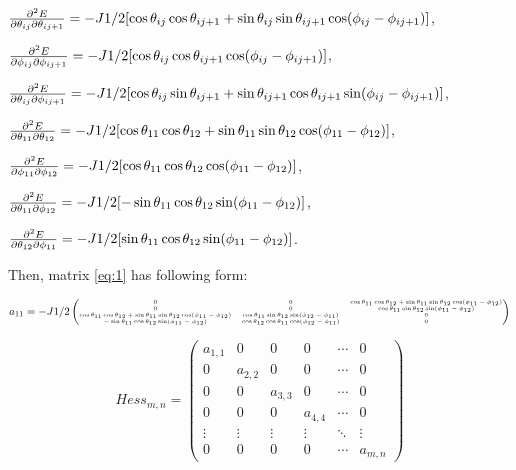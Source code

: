 \documentclass[9pt]{report}
\begin{document}
$\pdv{E}{\theta_{ij}}{\theta_{ij+1}} = -J1/2[\cos\theta_{ij}\cos\theta_{ij+1}+\sin\theta_{ij}\sin\theta_{ij+1}\cos(\phi_{ij}-\phi_{ij+1})]$,

$\pdv{E}{\phi_{ij}}{\phi_{ij+1}} = -J1/2[\cos\theta_{ij}\cos\theta_{ij+1}\cos(\phi_{ij}-\phi_{ij+1})]$,

$\pdv{E}{\theta_{ij}}{\phi_{ij+1}} = -J1/2[\cos\theta_{ij}\sin\theta_{ij+1}+\sin\theta_{ij+1}\cos\theta_{ij+1}\sin(\phi_{ij}-\phi_{ij+1})]$,

$\pdv{E}{\theta_{11}}{\theta_{12}} = -J1/2[\cos\theta_{11}\cos\theta_{12}+\sin\theta_{11}\sin\theta_{12}\cos(\phi_{11}-\phi_{12})]$,

$\pdv{E}{\phi_{11}}{\phi_{12}} = -J1/2[\cos\theta_{11}\cos\theta_{12}\cos(\phi_{11}-\phi_{12})]$,

$\pdv{E}{\theta_{11}}{\phi_{12}} = -J1/2[-\sin\theta_{11}\cos\theta_{12}\sin(\phi_{11}-\phi_{12})]$,

$\pdv{E}{\theta_{12}}{\phi_{11}} = -J1/2[\sin\theta_{11}\cos\theta_{12}\sin(\phi_{11}-\phi_{12})]$.
\newline

Then, matrix \eqref{eq:1} has following form:

\begin{equation}\tiny
	a_{11} = -J1/2\begin{pmatrix}
				0 & 0 & \cos\theta_{11}\cos\theta_{12}+\sin\theta_{11}\sin\theta_{12}\cos(\phi_{11}-\phi_{12})\\
				0 & 0 & \cos\theta_{11}\sin\theta_{12}\sin(\phi_{11}-\phi_{12})\\
				\cos\theta_{11}\cos\theta_{12}+\sin\theta_{11}\sin\theta_{12}\cos(\phi_{11}-\phi_{12}) & \cos\theta_{11}\sin\theta_{12}\sin(\phi_{12}-\phi_{11}) & 0\\
				-\sin\theta_{11}\cos\theta_{12}\sin(\phi_{11}-\phi_{12}) & \cos\theta_{12}\cos\theta_{11}\cos(\phi_{12}-\phi_{11}) & 0\\
			 \end{pmatrix}
\end{equation}

\begin{equation*}
	Hess_{m,n} = 
	\begin{pmatrix}
		a_{1,1} & 0 & 0 & 0 &\cdots & 0 \\
		0 & a_{2,2} & 0 & 0 &\cdots & 0 \\
		0 & 0 & a_{3,3} & 0 &\cdots & 0 \\
		0 & 0 & 0 & a_{4,4} &\cdots & 0 \\
		\vdots  & \vdots  & \vdots & \vdots & \ddots & \vdots\\
		0 & 0 & 0 & 0 & \cdots & a_{m,n} 
	\end{pmatrix}
\end{equation*}
\end{document}
